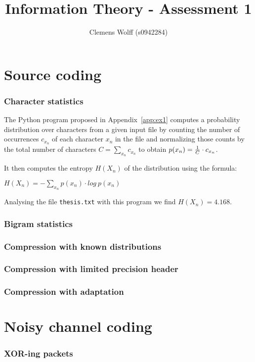 \documentclass[10pt,a4paper,twoside,twocolumn]{article}
\title{Information Theory - Assessment 1}
\author{Clemens Wolff (s0942284)}
\date{\vspace{-2em}}
\newcommand*{\thesisTXT}{{\tt thesis.txt}\xspace}
\begin{document}
\maketitle


\part{Source coding}

\section{Character statistics}
The Python program proposed in Appendix~\ref{app:ex1} computes a probability
distribution over characters from a given input file by counting the number of
occurrences $c_{x_n}$ of each character $x_n$ in the file and normalizing those
counts by the total number of characters $C = \sum\limits_{x_n} c_{x_n}$ to
obtain $p(x_n) = {1 \over C} \cdot c_{x_n}$.

It then computes the entropy $H(X_n)$ of the distribution using the formula:
\begin{center}
    $H(X_n) = -\sum\limits_{x_n} p(x_n) \cdot log~p(x_n)$
\end{center}
Analysing the file \thesisTXT with this program we find $H(X_n) = 4.168$.

\section{Bigram statistics}
\section{Compression with known distributions}
\section{Compression with limited precision header}
\section{Compression with adaptation}


\part{Noisy channel coding}

\section{XOR-ing packets}
\end{document}
